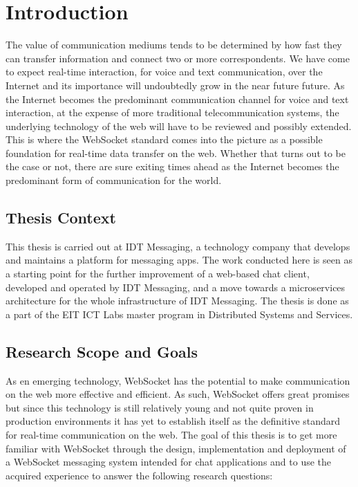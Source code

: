\chapter{Introduction}
\label{chapter:intro}

The value of communication mediums tends to be determined by how fast they can transfer information and connect two or more correspondents. We have come to expect real-time interaction, for voice and text communication, over the Internet and its importance will undoubtedly  grow in the near future future. As the Internet becomes the predominant communication channel for voice and text interaction, at the expense of more traditional telecommunication systems, the underlying technology of the web will have to be reviewed and possibly extended. This is where the WebSocket standard comes into the picture as a possible foundation for real-time data transfer on the web. Whether that turns out to be the case or not, there are sure exiting times ahead as the Internet becomes the predominant form of communication for the world.

\section{Thesis Context}

This thesis is carried out at IDT Messaging, a technology company that develops and maintains a platform for messaging apps. The work conducted here is seen as a starting point for the further improvement of a web-based chat client, developed and operated by IDT Messaging, and a move towards a microservices architecture for the whole infrastructure of IDT Messaging. The thesis is done as a part of the EIT ICT Labs master program in Distributed Systems and Services.

\section{Research Scope and Goals}

As en emerging technology, WebSocket has the potential to make communication on the web more effective and efficient. As such, WebSocket offers great promises but since this technology is still relatively young and not quite proven in production environments it has yet to establish itself as the definitive standard for real-time communication on the web. The goal of this thesis is to get more familiar with WebSocket through the design, implementation and deployment of a WebSocket messaging system intended for chat applications and to use the acquired experience to answer the following research questions:

